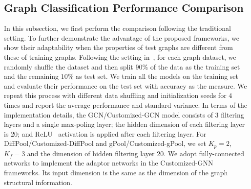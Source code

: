 \documentclass[11pt,dvipdfm]{article}
\begin{document}
\subsection{Graph Classification Performance Comparison}

In this subsection, we first perform the comparison following the traditional setting. To further demonstrate the advantage of the proposed frameworks, we show their adaptability when the properties of test graphs are different from these of training graphs. Following the setting in~\cite{ying2018hierarchical}, for each graph dataset, we randomly shuffle the dataset and then split $90\%$ of the data as the training set and the remaining $10\%$ as test set.  We train all the models on the training set and evaluate their performance on the test set with accuracy as the measure. We repeat this process with different data shuffling and initialization seeds for $4$ times and report the average performance and standard variance. In terms of the implementation details, the GCN/Customized-GCN model consists of $3$ filtering layers and a single max-poling layer; the hidden dimension of each filtering layer is $20$; and ReLU~\cite{nair2010rectified} activation is applied after each filtering layer. For DiffPool/Customized-DiffPool and gPool/Customized-gPool, we set $K_p=2$, $K_f=3$ and the dimension of hidden filtering layer $20$. We adopt fully-connected networks to implement the adaptor networks in the Customized-GNN frameworks. Its input dimension is the same as the dimension of the graph structural information.

\end{document}
